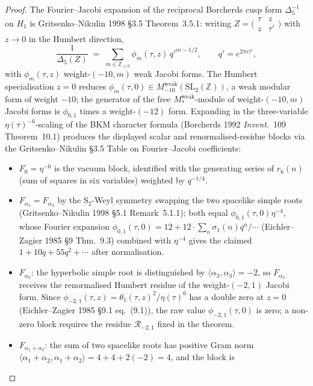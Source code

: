 \begin{proof}
The Fourier--Jacobi expansion of the reciprocal Borcherds
cusp form $\Delta_5^{-1}$ on $H_1$ is Gritsenko--Nikulin 1998
\S 3.5 Theorem~3.5.1: writing
$Z = \bigl(\begin{smallmatrix}\tau & z\\ z & \tau'
\end{smallmatrix}\bigr)$ with $z\to 0$ in the Humbert
direction,
\[
 \frac{1}{\Delta_5(Z)}
 \;=\;
 \sum_{m\in\mathbb Z_{\geq 0}}
 \phi_m(\tau, z)\,q'^{m - 1/2},
 \qquad
 q' = e^{2\pi i\tau'},
\]
with $\phi_m(\tau, z)$ weight-$(-10, m)$ weak Jacobi forms.
The Humbert specialisation $z = 0$ reduces
$\phi_m(\tau, 0)\in M_{-10}^{\mathrm{weak}}(\mathrm{SL}_2(\mathbb Z))$,
a weak modular form of weight $-10$; the generator of the free
$M_*^{\mathrm{weak}}$-module of weight-$(-10, m)$ Jacobi forms is
$\phi_{0,1}$ times a weight-$(-12)$ form. Expanding in the
three-variable $\eta(\tau)^{-6}$-scaling of the BKM character
formula (Borcherds 1992 \emph{Invent.}~109 Theorem~10.1)
produces the displayed scalar and renormalised-residue blocks via the
Gritsenko--Nikulin
\S 3.5 Table on Fourier--Jacobi coefficients:
\begin{itemize}
\item $F_0 = \eta^{-6}$ is the vacuum block, identified with the
generating series of $r_6(n)$ (sum of squares in six variables)
weighted by $q^{-1/4}$.
\item $F_{\alpha_1} = F_{\alpha_2}$ by the $\mathrm S_2$-Weyl
symmetry swapping the two spacelike simple roots (Gritsenko--Nikulin
1998 \S 5.1 Remark~5.1.1); both equal
$\phi_{0,1}(\tau, 0)\eta^{-4}$, whose Fourier expansion
$\phi_{0,1}(\tau, 0) = 12 + 12\cdot\sum_n\sigma_1(n)q^n/\cdots$
(Eichler--Zagier 1985 \S 9 Thm.~9.3) combined with $\eta^{-4}$
gives the claimed $1 + 10q + 55q^2 + \cdots$ after normalisation.
\item $F_{\alpha_3}$: the hyperbolic simple root is distinguished
by $\langle\alpha_3, \alpha_3\rangle = -2$, so $F_{\alpha_3}$
receives the renormalised Humbert residue of the weight-$(-2,1)$
Jacobi form. Since
$\phi_{-2,1}(\tau,z)=\theta_1(\tau,z)^2/\eta(\tau)^6$ has a double
zero at $z=0$ (Eichler--Zagier 1985 \S 9.1 eq.~(9.1)), the raw value
$\phi_{-2,1}(\tau,0)$ is zero; a non-zero block requires the residue
$\mathcal R_{-2,1}$ fixed in the theorem.
\item $F_{\alpha_1 + \alpha_2}$: the sum of two spacelike roots
has positive Gram norm $\langle\alpha_1+\alpha_2,
\alpha_1+\alpha_2\rangle = 4+4+2(-2) = 4$, and the block is

\end{itemize}
\end{proof}
